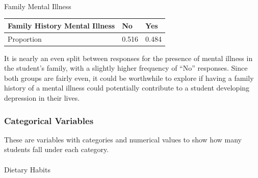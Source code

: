 \documentclass[
  letterpaper,
  DIV=11,
  numbers=noendperiod]{scrartcl}
\makeatletter
\let\oldparagraph\paragraph
\renewcommand{\paragraph}{
    \@ifstar
      \xxxParagraphStar
      \xxxParagraphNoStar
  }
\newcommand{\xxxParagraphStar}[1]{\oldparagraph*{#1}\mbox{}}
\newcommand{\xxxParagraphNoStar}[1]{\oldparagraph{#1}\mbox{}}
\newenvironment{Shaded}{\begin{snugshade}}{\end{snugshade}}
\newcommand{\AttributeTok}[1]{\textcolor[rgb]{0.40,0.45,0.13}{#1}}
\newcommand{\DecValTok}[1]{\textcolor[rgb]{0.68,0.00,0.00}{#1}}
\newcommand{\FunctionTok}[1]{\textcolor[rgb]{0.28,0.35,0.67}{#1}}
\newcommand{\NormalTok}[1]{\textcolor[rgb]{0.00,0.23,0.31}{#1}}
\newcommand{\SpecialCharTok}[1]{\textcolor[rgb]{0.37,0.37,0.37}{#1}}
\makeatother
\begin{document}
\paragraph{Family Mental Illness}\label{family-mental-illness}

\begin{Shaded}
\end{Shaded}

\begin{longtable}[]{@{}lll@{}}
\toprule\noalign{}
Family History Mental Illness & No & Yes \\
\midrule\noalign{}
\endhead
\bottomrule\noalign{}
\endlastfoot
Proportion & 0.516 & 0.484 \\
\end{longtable}

It is nearly an even split between responses for the presence of mental
illness in the student's family, with a slightly higher frequency of
``No'' responses. Since both groups are fairly even, it could be
worthwhile to explore if having a family history of a mental illness
could potentially contribute to a student developing depression in their
lives.

\subsubsection{Categorical Variables}\label{categorical-variables}

These are variables with categories and numerical values to show how
many students fall under each category.

\paragraph{Dietary Habits}\label{dietary-habits}

\begin{Shaded}
\end{Shaded}
\end{document}
